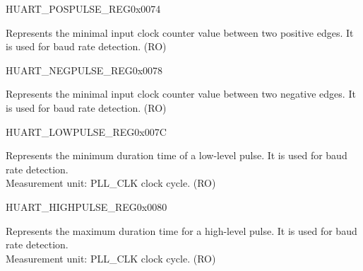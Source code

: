 \begin{register}{H}{UART\_POSPULSE\_REG}{0x0074}\label{regdesc:UARTPOSPULSEREG}
%
%
\regnewline%
\begin{regdesc}\begin{reglist}
\label{fielddesc:UARTPOSEDGEMINCNT}\item [UART\_POSEDGE\_MIN\_CNT] Represents the minimal input clock counter value between two positive edges. It is used for baud rate detection. (RO)
\end{reglist}\end{regdesc}
\end{register}


\begin{register}{H}{UART\_NEGPULSE\_REG}{0x0078}\label{regdesc:UARTNEGPULSEREG}
%
%
\regnewline%
\begin{regdesc}\begin{reglist}
\label{fielddesc:UARTNEGEDGEMINCNT}\item [UART\_NEGEDGE\_MIN\_CNT] Represents the minimal input clock counter value between two negative edges. It is used for baud rate detection. (RO)
\end{reglist}\end{regdesc}
\end{register}


\begin{register}{H}{UART\_LOWPULSE\_REG}{0x007C}\label{regdesc:UARTLOWPULSEREG}
%
%
\regnewline%
\begin{regdesc}\begin{reglist}
\label{fielddesc:UARTLOWPULSEMINCNT}\item [UART\_LOWPULSE\_MIN\_CNT] Represents the minimum duration time of a low-level pulse. It is used for baud rate detection.\\Measurement unit: PLL\_CLK clock cycle. (RO)
\end{reglist}\end{regdesc}
\end{register}


\begin{register}{H}{UART\_HIGHPULSE\_REG}{0x0080}\label{regdesc:UARTHIGHPULSEREG}
%
%
\regnewline%
\begin{regdesc}\begin{reglist}
\label{fielddesc:UARTHIGHPULSEMINCNT}\item [UART\_HIGHPULSE\_MIN\_CNT] Represents  the maximum duration time for a high-level pulse. It is used for baud rate detection.\\Measurement unit: PLL\_CLK clock cycle.  (RO)
\end{reglist}\end{regdesc}
\end{register}


